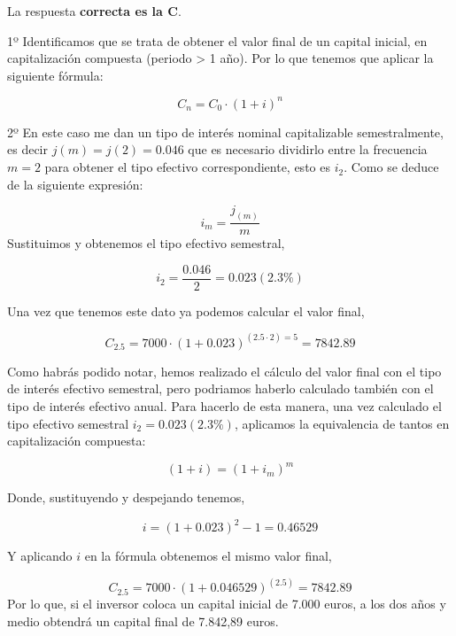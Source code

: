 \documentclass[
  letterpaper,
  DIV=11,
  numbers=noendperiod]{scrreprt}
\begin{document}
\begin{tcolorbox}[enhanced jigsaw, left=2mm, opacityback=0, colback=white, breakable, arc=.35mm, bottomrule=.15mm, rightrule=.15mm, toprule=.15mm, leftrule=.75mm, colframe=quarto-callout-tip-color-frame]
\begin{minipage}[t]{5.5mm}
\textcolor{quarto-callout-tip-color}{\faLightbulb}
\end{minipage}%
\begin{minipage}[t]{\textwidth - 5.5mm}

La respuesta \textbf{correcta es la C}.

1º Identificamos que se trata de obtener el valor final de un capital
inicial, en capitalización compuesta (periodo \textgreater{} 1 año). Por
lo que tenemos que aplicar la siguiente fórmula:

\[C_{ n }=C_{ 0 }\cdot { (1+i) }^{ n }\]

2º En este caso me dan un tipo de interés nominal capitalizable
semestralmente, es decir \(j(m) = j(2) = 0.046\) que es necesario
dividirlo entre la frecuencia \(m = 2\) para obtener el tipo efectivo
correspondiente, esto es \(i _2\). Como se deduce de la siguiente
expresión:

\[i_m=\frac{j _{(m)}}{m}\] Sustituimos y obtenemos el tipo efectivo
semestral,

\[i_2=\frac{0.046}{2}= 0.023 (2.3\%)\]

Una vez que tenemos este dato ya podemos calcular el valor final,

\[C_{ 2.5}=7000\cdot { (1+0.023) }^{(2.5\cdot 2) = 5} = 7842.89\]

Como habrás podido notar, hemos realizado el cálculo del valor final con
el tipo de interés efectivo semestral, pero podriamos haberlo calculado
también con el tipo de interés efectivo anual. Para hacerlo de esta
manera, una vez calculado el tipo efectivo semestral
\(i_2=0.023 (2.3\%)\), aplicamos la equivalencia de tantos en
capitalización compuesta:

\[(1+i)=(1+ i _m)^m\]

Donde, sustituyendo y despejando tenemos,

\[i=(1+ 0.023)^{2}-1= 0.46529\]

Y aplicando \(i\) en la fórmula obtenemos el mismo valor final,

\[C_{ 2.5}=7000\cdot { (1+0.046529) }^{(2.5)} = 7842.89\] Por lo que, si
el inversor coloca un capital inicial de 7.000 euros, a los dos años y
medio obtendrá un capital final de 7.842,89 euros.

\end{minipage}%
\end{tcolorbox}
\end{document}
